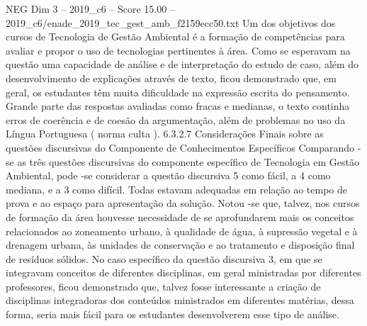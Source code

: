 \begin{textsample}{NEG Dim 3 – 2019\_c6 – Score 15.00 – 2019\_c6/enade\_2019\_tec\_gest\_amb\_f2159ecc50.txt}
Um dos objetivos dos cursos de Tecnologia de Gestão Ambiental é a formação de competências para avaliar e propor o uso de tecnologias pertinentes à área.
Como se esperavam na questão uma capacidade de análise e de interpretação do estudo de caso, além do desenvolvimento de explicações através de texto, ficou demonstrado que, em geral, os estudantes têm muita dificuldade na expressão escrita do pensamento.
Grande parte das respostas avaliadas como fracas e medianas, o texto continha erros de coerência e de coesão da argumentação, além de problemas no uso da Língua Portuguesa ( norma culta ). 6.3.2.7 Considerações Finais sobre as questões discursivas do Componente de Conhecimentos Específicos Comparando -se as três questões discursivas do componente específico de Tecnologia em Gestão Ambiental, pode -se considerar a questão discursiva 5 como fácil, a 4 como mediana, e a 3 como difícil.
Todas estavam adequadas em relação ao tempo de prova e ao espaço para apresentação da solução.
Notou -se que, talvez, nos cursos de formação da área houvesse necessidade de se aprofundarem mais os conceitos relacionados ao zoneamento urbano, à qualidade de água, à supressão vegetal e à drenagem urbana, às unidades de conservação e ao tratamento e disposição final de resíduos sólidos.
No caso específico da questão discursiva 3, em que se integravam conceitos de diferentes disciplinas, em geral ministradas por diferentes professores, ficou demonstrado que, talvez fosse interessante a criação de disciplinas integradoras dos conteúdos ministrados em diferentes matérias, dessa forma, seria mais fácil para os estudantes desenvolverem esse tipo de análise.

\end{textsample}
